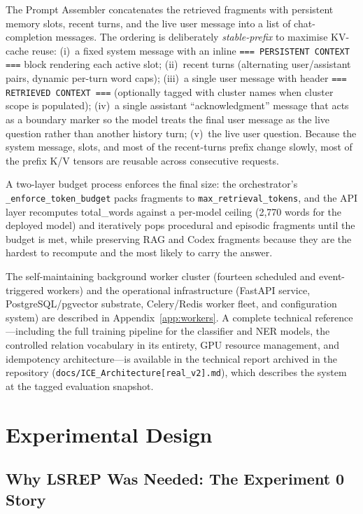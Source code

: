 \documentclass[10pt]{article}
\begin{document}
The Prompt Assembler concatenates the retrieved fragments with persistent memory slots, recent turns, and the live user message into a list of chat-completion messages. The ordering is deliberately \emph{stable-prefix} to maximise KV-cache reuse: (i)~a fixed system message with an inline \texttt{=== PERSISTENT CONTEXT ===} block rendering each active slot; (ii)~recent turns (alternating user/assistant pairs, dynamic per-turn word caps); (iii)~a single user message with header \texttt{=== RETRIEVED CONTEXT ===} (optionally tagged with cluster names when cluster scope is populated); (iv)~a single assistant ``acknowledgment'' message that acts as a boundary marker so the model treats the final user message as the live question rather than another history turn; (v)~the live user question. Because the system message, slots, and most of the recent-turns prefix change slowly, most of the prefix K/V tensors are reusable across consecutive requests.

A two-layer budget process enforces the final size: the orchestrator's \texttt{\_enforce\_token\_budget} packs fragments to \texttt{max\_retrieval\_tokens}, and the API layer recomputes total\_words against a per-model ceiling (2{,}770 words for the deployed model) and iteratively pops procedural and episodic fragments until the budget is met, while preserving RAG and Codex fragments because they are the hardest to recompute and the most likely to carry the answer.

The self-maintaining background worker cluster (fourteen scheduled and event-triggered workers) and the operational infrastructure (FastAPI service, PostgreSQL/pgvector substrate, Celery/Redis worker fleet, and configuration system) are described in Appendix~\ref{app:workers}. A complete technical reference---including the full training pipeline for the classifier and NER models, the controlled relation vocabulary in its entirety, GPU resource management, and idempotency architecture---is available in the technical report archived in the repository (\texttt{docs/ICE\_Architecture[real\_v2].md}), which describes the system at the tagged evaluation snapshot.

\section{Experimental Design}
\label{sec:exp-design}

\subsection{Why LSREP Was Needed: The Experiment 0 Story}
\end{document}
